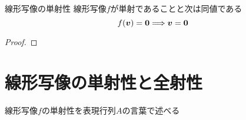 \documentclass[../../../topic_linear-algebra]{subfiles}
\begin{document}
\sectionline

\begin{theorem}{線形写像の単射性}
  線形写像$f$が単射であることと次は同値である
  \begin{equation*}
    f(\vb*{v}) = \vb*{0} \Longrightarrow \vb*{v} = \vb*{0}
  \end{equation*}
\end{theorem}

\begin{proof}
\end{proof}

\sectionline
\section{線形写像の単射性と全射性}

線形写像$f$の単射性を表現行列$A$の言葉で述べる



\end{document}
